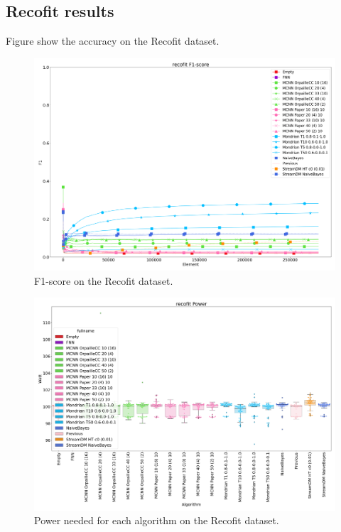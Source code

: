 \subsection{Recofit results}
Figure show the accuracy on the Recofit dataset.

\begin{figure}[H]
	\includegraphics[width=\linewidth]{figures/results/recofit_f1.png}
	\caption{F1-score on the Recofit dataset.}
\end{figure}
\begin{figure}[H]
	\includegraphics[width=\linewidth]{figures/results/recofit_watt.png}
	\caption{Power needed for each algorithm on the Recofit dataset.}
\end{figure}
